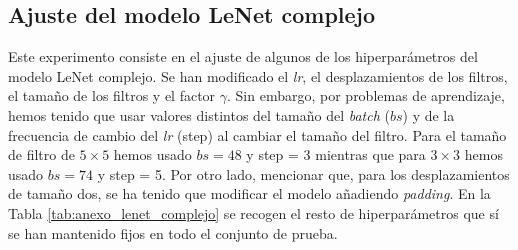 \documentclass[a4paper,12pt,oneside,titlepage]{book}
\begin{document}
\begin{appendices}
  \section{Ajuste del modelo LeNet complejo}
  \label{an:5}

  Este experimento consiste en el ajuste de algunos de los hiperparámetros del modelo LeNet complejo. Se han modificado el \textit{lr}, el desplazamientos de los filtros, el tamaño de los filtros y el factor $\gamma$. Sin embargo, por problemas de aprendizaje, hemos tenido que usar valores distintos del tamaño del \textit{batch} ($bs$) y de la frecuencia de cambio del \textit{lr} (step) al cambiar el tamaño del filtro. Para el tamaño de filtro de $5\times 5$ hemos usado $bs = 48$ y step = 3 mientras que para $3\times 3$ hemos usado $bs = 74$ y step = 5. Por otro lado, mencionar que, para los desplazamientos de tamaño dos, se ha tenido que modificar el modelo añadiendo \textit{padding}. En la Tabla \ref{tab:anexo_lenet_complejo} se recogen el resto de hiperparámetros que sí se han mantenido fijos en todo el conjunto de prueba.


  \begin{table}[h!]
    \caption{Hiperparámetros fijos de los experimentos recogidos en la Tabla \ref{tab:resultados_kernel_complejo}.}
    \label{tab:anexo_lenet_complejo}
  \end{table}


\end{appendices}
\end{document}
